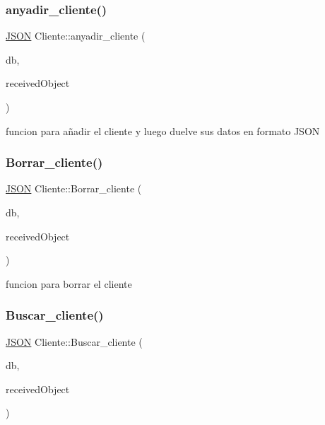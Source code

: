 \subsubsection{\texorpdfstring{anyadir\+\_\+cliente()}{anyadir\_cliente()}}
{\footnotesize\ttfamily \mbox{\hyperlink{classnlohmann_1_1basic__json}{J\+S\+ON}} Cliente\+::anyadir\+\_\+cliente (\begin{DoxyParamCaption}\item[{Q\+Sql\+Database}]{db,  }\item[{\mbox{\hyperlink{classnlohmann_1_1basic__json}{J\+S\+ON}}}]{received\+Object }\end{DoxyParamCaption})}

funcion para añadir el cliente y luego duelve sus datos en formato J\+S\+ON\mbox{\label{classCliente_ae439ec32dce5171c876e9a6210ca8633}} 
\subsubsection{\texorpdfstring{Borrar\+\_\+cliente()}{Borrar\_cliente()}}
{\footnotesize\ttfamily \mbox{\hyperlink{classnlohmann_1_1basic__json}{J\+S\+ON}} Cliente\+::\+Borrar\+\_\+cliente (\begin{DoxyParamCaption}\item[{Q\+Sql\+Database}]{db,  }\item[{\mbox{\hyperlink{classnlohmann_1_1basic__json}{J\+S\+ON}}}]{received\+Object }\end{DoxyParamCaption})}

funcion para borrar el cliente\mbox{\label{classCliente_ac448f4e423f0e60d706e5e20e88212a9}} 
\subsubsection{\texorpdfstring{Buscar\+\_\+cliente()}{Buscar\_cliente()}}
{\footnotesize\ttfamily \mbox{\hyperlink{classnlohmann_1_1basic__json}{J\+S\+ON}} Cliente\+::\+Buscar\+\_\+cliente (\begin{DoxyParamCaption}\item[{Q\+Sql\+Database}]{db,  }\item[{\mbox{\hyperlink{classnlohmann_1_1basic__json}{J\+S\+ON}}}]{received\+Object }\end{DoxyParamCaption})}

